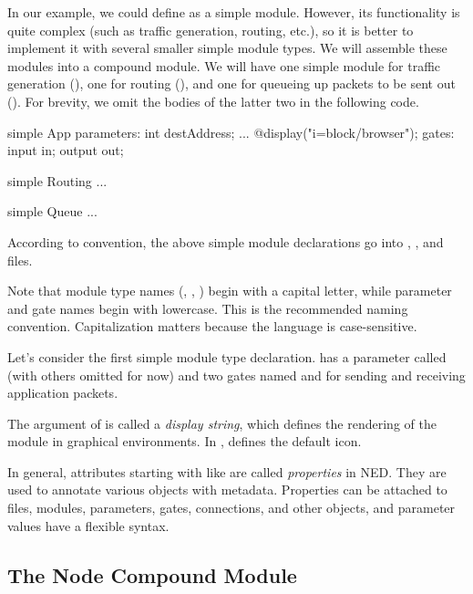 In our example, we could define  as a simple module. However, its
functionality is quite complex (such as traffic generation, routing, etc.), so
it is better to implement it with several smaller simple module types. We will
assemble these modules into a compound module. We will have one simple module
for traffic generation (), one for routing (), and one for
queueing up packets to be sent out (). For brevity, we omit the
bodies of the latter two in the following code.

\begin{ned}
simple App
{
    parameters:
        int destAddress;
        ...
        @display("i=block/browser");
    gates:
        input in;
        output out;
}

simple Routing
{
    ...
}

simple Queue
{
    ...
}
\end{ned}

According to convention, the above simple module declarations go into
, , and  files.

\begin{note}
    Note that module type names (, , ) begin
    with a capital letter, while parameter and gate names begin with lowercase.
    This is the recommended naming convention. Capitalization matters because
    the language is case-sensitive.
\end{note}

Let's consider the first simple module type declaration.  has a
parameter called  (with others omitted for now) and two gates
named  and  for sending and receiving application packets.

The argument of  is called a \textit{display string}, which
defines the rendering of the module in graphical environments. In
,  defines the default icon.

In general, attributes starting with  like  are called
\textit{properties} in NED. They are used to annotate various objects with
metadata. Properties can be attached to files, modules, parameters, gates,
connections, and other objects, and parameter values have a flexible syntax.


\subsection{The Node Compound Module}
\label{sec:warmup:ned-lang:node-compound-module}

